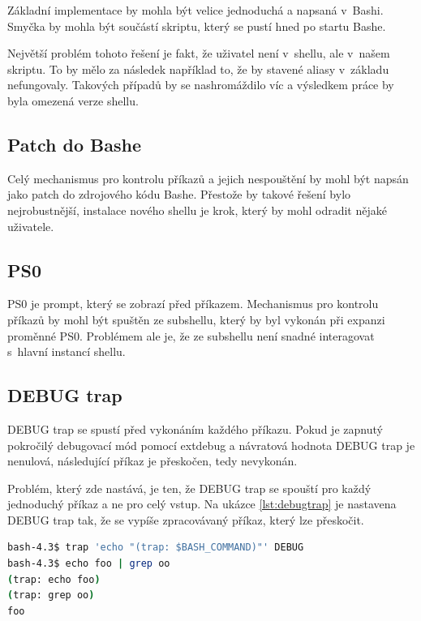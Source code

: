 \documentclass[thesis=M,czech]{FITthesis}[2012/06/26]
\begin{document}
Základní implementace by mohla být velice jednoduchá a napsaná v~Bashi. Smyčka by mohla být součástí skriptu, který se pustí hned po startu Bashe.

Největší problém tohoto řešení je fakt, že uživatel není v~shellu, ale v~našem skriptu. To by mělo za následek například to, že by stavené aliasy v~základu nefungovaly. Takových případů by se nashromáždilo víc a výsledkem práce by byla omezená verze shellu.


%
%
\subsection{Patch do Bashe}

Celý mechanismus pro kontrolu příkazů a jejich nespouštění by mohl být napsán jako patch do zdrojového kódu Bashe. Přestože by takové řešení bylo nejrobustnější, instalace nového shellu je krok, který by mohl odradit nějaké uživatele.

%
\subsection{PS0}

PS0 je prompt, který se zobrazí před  příkazem. Mechanismus pro kontrolu příkazů by mohl být spuštěn ze subshellu, který by byl vykonán při expanzi proměnné PS0. Problémem ale je, že ze subshellu není snadné interagovat s~hlavní instancí shellu.

%
%
\subsection{DEBUG trap}

DEBUG trap se spustí před vykonáním každého příkazu. Pokud je zapnutý pokročilý debugovací mód pomocí extdebug a návratová hodnota DEBUG trap je nenulová, následující příkaz je přeskočen, tedy nevykonán.

Problém, který zde nastává, je ten, že DEBUG trap se spouští pro každý jednoduchý příkaz a ne pro celý vstup. Na ukázce \ref{lst:debugtrap} je nastavena DEBUG trap tak, že se vypíše zpracovávaný příkaz, který lze přeskočit.

\begin{lstlisting}[language=bash, caption={DEBUG trap}, label={lst:debugtrap}]
bash-4.3$ trap 'echo "(trap: $BASH_COMMAND)"' DEBUG
bash-4.3$ echo foo | grep oo
(trap: echo foo)
(trap: grep oo)
foo
\end{lstlisting}
\end{document}
